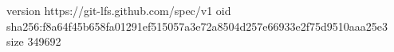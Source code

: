 version https://git-lfs.github.com/spec/v1
oid sha256:f8a64f45b658fa01291ef515057a3e72a8504d257e66933e2f75d9510aaa25e3
size 349692
